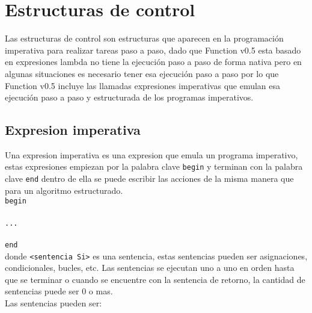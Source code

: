 
\titlespacing{\subsection}{0pt}{10pt}{0pt}

\chapter{Estructuras de control}
   Las estructuras de control son estructuras que aparecen en la programación imperativa para realizar tareas paso a paso, dado que Function v0.5 esta basado en expresiones lambda no tiene la ejecución paso a paso de forma nativa pero en algunas situaciones es necesario tener esa ejecución paso a paso por lo que Function v0.5 incluye las llamadas expresiones imperativas que emulan esa ejecución paso a paso y estructurada de los programas imperativos.
   
   \section{Expresion imperativa}
      Una expresion imperativa es una expresion que emula un programa imperativo, estas expresiones empiezan por la palabra clave \texttt{begin} y terminan con la palabra clave \texttt{end} dentro de ella se puede escribir las acciones de la misma manera que para un algoritmo estructurado.
      \\
      
      \texttt{begin}\\
      \texttt{}\\
      \texttt{\linetab...}\\
      \texttt{}\\
      \texttt{end}
      \\
      
      donde \texttt{<sentencia Si>} es una sentencia, estas sentencias pueden ser asignaciones, condicionales, bucles, etc. Las sentencias se ejecutan uno a uno en orden hasta que se terminar o cuando se encuentre con la sentencia de retorno, la cantidad de sentencias puede ser 0 o mas.
      \\
      
      Las sentencias pueden ser:
      
